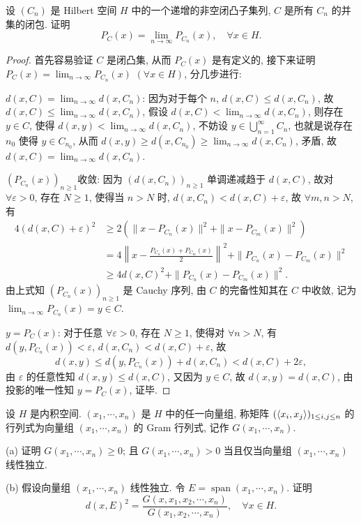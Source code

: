 \begin{exercise}
    设 $\left(C_{n}\right)$ 是 Hilbert 空间 $H$ 中的一个递增的非空闭凸子集列, $C$ 是所有 $C_n$ 的并集的闭包. 证明
    \[
    P_{C}(x)=\lim_{n\to\infty} P_{C_n}(x), \quad \forall x \in H.
    \]
\end{exercise}

\begin{proof}
    首先容易验证 $C$ 是闭凸集, 从而 $P_C(x)$ 是有定义的, 
    接下来证明 $P_C(x)=\lim_{n\to\infty}P_{C_n}(x)$ $(\forall x\in H)$, 分几步进行:

    $d(x,C)=\lim_{n\to\infty}d(x,C_n)$:
    因为对于每个 $n$, $d(x,C)\leq d(x,C_n)$,
    故 $d(x,C)\leq \lim_{n\to\infty}d(x,C_n)$,
    假设 $d(x,C)<\lim_{n\to\infty}d(x,C_n)$,
    则存在 $y\in C$, 使得 $d(x,y)<\lim_{n\to\infty}d(x,C_n)$,
    不妨设 $y\in\bigcup_{n=1}^{\infty}C_n$, 也就是说存在 $n_0$ 使得 $y\in C_{n_0}$,
    从而 $d(x,y)\geq d(x,C_{n_0})\geq\lim_{n\to\infty}d(x,C_n)$, 矛盾, 故 $d(x,C)=\lim_{n\to\infty}d(x,C_n)$.
    
    $(P_{C_n}(x))_{n\geq 1}$收敛:
    因为 $(d(x,C_n))_{n\geq 1}$ 单调递减趋于 $d(x,C)$,
    故对 $\forall\varepsilon>0$, 存在 $N\geq 1$,
    使得当 $n>N$ 时, $d(x,C_n)<d(x,C)+\varepsilon$,
    故 $\forall m,n>N$, 有
    \begin{align*}
        4(d(x,C)+\varepsilon)^2
        &\geq 2(\|x-P_{C_n}(x)\|^2+\|x-P_{C_m}(x)\|^2) \\
        &=4\left\|x-\frac{P_{C_n}(x)+P_{C_m}(x)}{2}\right\|^2+\|P_{C_n}(x)-P_{C_m}(x)\|^2 \\
        &\geq 4d(x,C)^2+\|P_{C_n}(x)-P_{C_m}(x)\|^2.
    \end{align*}
    由上式知 $(P_{C_n}(x))_{n\geq 1}$ 是 Cauchy 序列, 
    由 $C$ 的完备性知其在 $C$ 中收敛, 记为 $\lim_{n\to\infty}P_{C_n}(x)=y\in C$.
    
    $y=P_C(x)$: 
    对于任意 $\forall\varepsilon>0$,
    存在 $N\geq 1$, 使得对 $\forall n>N$,
    有 $d(y,P_{C_n}(x))<\varepsilon$, $d(x,C_n)<d(x,C)+\varepsilon$, 故
    \[d(x,y)\leq d(y,P_{C_n}(x))+d(x,C_n)<d(x,C)+2\varepsilon,\] 
    由 $\varepsilon$ 的任意性知 $d(x,y)\leq d(x,C)$, 又因为 $y\in C$, 
    故 $d(x,y)=d(x,C)$, 由投影的唯一性知 $y=P_C(x)$, 证毕.
\end{proof}




\begin{exercise}
    设 $H$ 是内积空间. $(x_{1}, \cdots, x_{n})$ 是 $H$ 中的任一向量组,
    称矩阵 $(\langle x_i,x_j\rangle)_{1\leq i,j\leq n}$ 
    的行列式为向量组 $\left(x_{1},\cdots, x_{n}\right)$ 的 Gram 行列式, 记作 $G(x_{1},\cdots,x_{n})$.
    
    (a) 证明 $G(x_{1},\cdots,x_{n})\geq 0$; 
    且 $G\left(x_{1},\cdots,x_{n}\right)>0$ 当且仅当向量组 $\left(x_{1}, \cdots, x_{n}\right)$ 线性独立.
    
    (b) 假设向量组 $\left(x_{1},\cdots,x_{n}\right)$ 线性独立. 
    令 $E=\operatorname{span}\left(x_{1},\cdots, x_{n}\right)$. 证明
    \[
        d(x, E)^{2}=\frac{G\left(x, x_{1}, x_{2}, \cdots, x_{n}\right)}{G\left(x_{1}, x_{2}, \cdots, x_{n}\right)}, \quad \forall x\in H.
    \]
\end{exercise}

